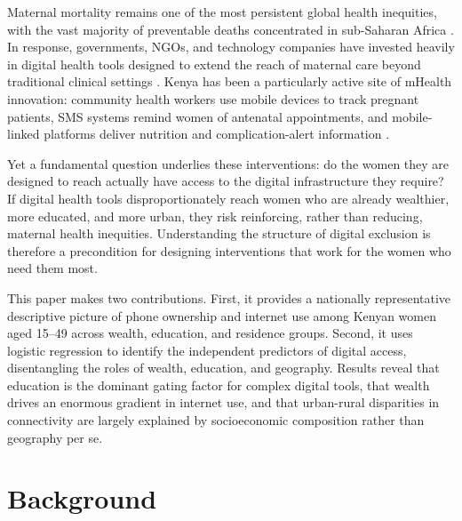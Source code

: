 \documentclass[9pt,twoside]{pnas-new}
\begin{document}

\maketitle
\thispagestyle{firststyle}
  {}{}

\Firstpage

Maternal mortality remains one of the most persistent global health
inequities, with the vast majority of preventable deaths concentrated in
sub-Saharan Africa \cite{who2025,unicef2023}. In response, governments,
NGOs, and technology companies have invested heavily in digital health
tools designed to extend the reach of maternal care beyond traditional
clinical settings \cite{mwaisaka2025}. Kenya has been a particularly
active site of mHealth innovation: community health workers use mobile
devices to track pregnant patients, SMS systems remind women of antenatal
appointments, and mobile-linked platforms deliver nutrition and
complication-alert information \cite{mwaisaka2025,nyatuka2025}.

Yet a fundamental question underlies these interventions: do the women
they are designed to reach actually have access to the digital
infrastructure they require? If digital health tools disproportionately
reach women who are already wealthier, more educated, and more urban,
they risk reinforcing, rather than reducing, maternal health
inequities. Understanding the structure of digital exclusion is therefore
a precondition for designing interventions that work for the women who
need them most.

\Endparasplit

This paper makes two contributions. First, it provides a nationally
representative descriptive picture of phone ownership and internet use
among Kenyan women aged 15--49 across wealth, education, and residence
groups. Second, it uses logistic regression to identify the independent
predictors of digital access, disentangling the roles of wealth,
education, and geography. Results reveal that education is the dominant
gating factor for complex digital tools, that wealth drives an enormous
gradient in internet use, and that urban-rural disparities in
connectivity are largely explained by socioeconomic composition rather
than geography per se.

\section*{Background}
\end{document}
